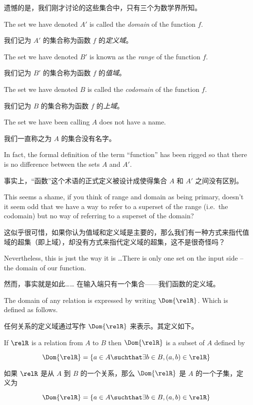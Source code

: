 遗憾的是，我们刚才讨论的这些集合中，只有三个为数学界所知。

The set we have denoted $A'$ is called the
\emph{domain} of the function $f$.

我们记为 $A'$ 的集合称为函数 $f$ 的\emph{定义域}。

The set we have denoted $B'$ is 
known as the \emph{range} of the function $f$.

我们记为 $B'$ 的集合称为函数 $f$ 的\emph{值域}。

The set we have denoted
$B$ is called the \emph{codomain} of the function $f$.

我们记为 $B$ 的集合称为函数 $f$ 的\emph{上域}。

The set we 
have been calling $A$ does not have a name.

我们一直称之为 $A$ 的集合没有名字。

In fact, the formal
definition of the term ``function'' has been rigged so that there
is no difference between the sets $A$ and $A'$.

事实上，“函数”这个术语的正式定义被设计成使得集合 $A$ 和 $A'$ 之间没有区别。

This seems a shame,
if you think of range and domain as being primary, doesn't it seem
odd that we have a way to refer to a superset of the range (i.e.\ the 
codomain) but no way of referring to a superset of the domain?

这似乎很可惜，如果你认为值域和定义域是主要的，那么我们有一种方式来指代值域的超集（即上域），却没有方式来指代定义域的超集，这不是很奇怪吗？

Nevertheless, this is just the way it is \ldots  There is only one
set on the input side -- the domain of our function.

然而，事实就是如此…… 在输入端只有一个集合——我们函数的定义域。

The domain of
any relation is expressed by writing $\Dom{\relR}$.  Which is 
defined as follows.

任何关系的定义域通过写作 $\Dom{\relR}$ 来表示。其定义如下。

\begin{defi}
If $\relR$ is a relation from $A$ to $B$ then $\Dom{\relR}$ is
a subset of $A$ defined by

\[ \Dom{\relR} = \{a \in A \suchthat \exists b \in B, (a,b) \in \relR \} 
\]

\end{defi}

\begin{defi}
如果 $\relR$ 是从 $A$ 到 $B$ 的一个关系，那么 $\Dom{\relR}$ 是 $A$ 的一个子集，定义为

\[ \Dom{\relR} = \{a \in A \suchthat \exists b \in B, (a,b) \in \relR \} 
\]

\end{defi}

